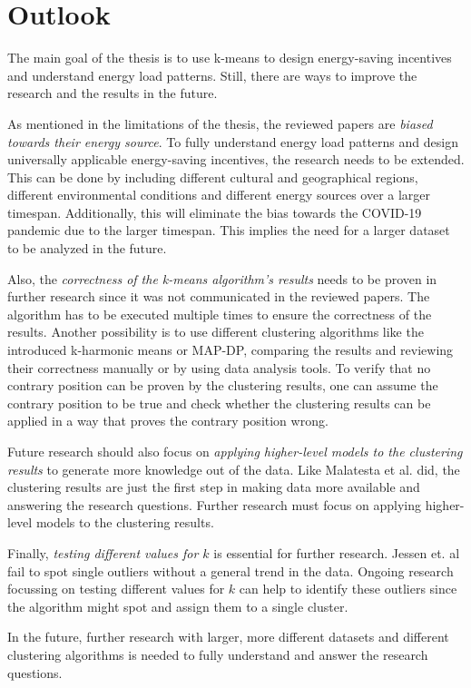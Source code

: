 
\section{Outlook}
\label{sec:outlook}
The main goal of the thesis is to use k-means to design energy-saving incentives and understand energy load patterns.
Still, there are ways to improve the research and the results in the future.

As mentioned in the limitations of the thesis, the reviewed papers are \textit{biased towards their energy source}.
To fully understand energy load patterns and design universally applicable energy-saving incentives, the research needs to be extended.
This can be done by including different cultural and geographical regions, different environmental conditions and different energy sources over a larger timespan.
Additionally, this will eliminate the bias towards the COVID-19 pandemic due to the larger timespan.
This implies the need for a larger dataset to be analyzed in the future.

Also, the \textit{correctness of the k-means algorithm's results} needs to be proven in further research since it was not communicated in the reviewed papers.
The algorithm has to be executed multiple times to ensure the correctness of the results.
Another possibility is to use different clustering algorithms like the introduced k-harmonic means or MAP-DP, comparing the results and reviewing their correctness manually or by using data analysis tools.
To verify that no contrary position can be proven by the clustering results, one can assume the contrary position to be true and check whether the clustering results can be applied in a way that proves the contrary position wrong.

Future research should also focus on \textit{applying higher-level models to the clustering results} to generate more knowledge out of the data.
Like Malatesta et al. \cite{MAL-HBP} did, the clustering results are just the first step in making data more available and answering the research questions.
Further research must focus on applying higher-level models to the clustering results.

Finally, \textit{testing different values for $k$} is essential for further research.
Jessen et. al \cite{JES-IND} fail to spot single outliers without a general trend in the data.
Ongoing research focussing on testing different values for $k$ can help to identify these outliers since the algorithm might spot and assign them to a single cluster.

In the future, further research with larger, more different datasets and different clustering algorithms is needed to fully understand and answer the research questions.